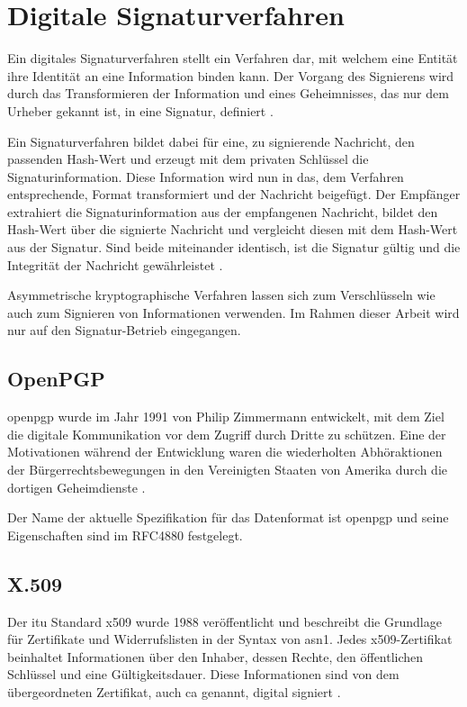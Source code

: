 \section{Digitale Signaturverfahren}
\label{sec:GrundlagenDefinitionen:DigitaleSignaturen:Verfahren}
Ein digitales Signaturverfahren stellt ein Verfahren dar, mit welchem eine Entität ihre Identität an eine Information binden kann. Der Vorgang des Signierens
wird durch das Transformieren der Information und eines Geheimnisses, das nur dem Urheber gekannt ist, in eine Signatur, definiert \cite{hac}.

Ein Signaturverfahren bildet dabei für eine, zu signierende Nachricht, den passenden Hash-Wert und erzeugt mit dem privaten Schlüssel die Signaturinformation.
Diese Information wird nun in das, dem Verfahren entsprechende, Format transformiert und der Nachricht beigefügt.
Der Empfänger extrahiert die Signaturinformation aus der empfangenen Nachricht, bildet den Hash-Wert über die signierte Nachricht und vergleicht diesen mit dem
Hash-Wert aus der Signatur. Sind beide miteinander identisch, ist die Signatur gültig und die Integrität der Nachricht gewährleistet \cite{hac,singh:messages}.

Asymmetrische kryptographische Verfahren lassen sich zum Verschlüsseln wie auch zum Signieren von Informationen verwenden. Im Rahmen dieser Arbeit wird nur auf
den Signatur-Betrieb eingegangen.

\subsection{OpenPGP}
\label{sec:GrundlagenDefinitionen:DigitaleSignaturen:Verfahren:openpgp}
\gls{openpgp} wurde im Jahr 1991 von Philip Zimmermann \cite{zimmermann:pgp} entwickelt, mit dem Ziel die digitale Kommunikation vor dem Zugriff durch Dritte zu
schützen. Eine der Motivationen während der Entwicklung waren die wiederholten Abhöraktionen der Bürgerrechtsbewegungen in den Vereinigten Staaten von Amerika
durch die dortigen Geheimdienste \cite{singh:messages}.

Der Name der aktuelle Spezifikation für das Datenformat ist \gls{openpgp} und seine Eigenschaften sind im RFC4880 \cite{openpgp:ietf} festgelegt.

\subsection{X.509}
\label{sec:GrundlagenDefinitionen:DigitaleSignaturen:Verfahren:x509}
Der \gls{itu} Standard \gls{x509} wurde 1988 veröffentlicht und beschreibt die Grundlage für Zertifikate und Widerrufslisten in der Syntax von \gls{asn1}.
Jedes \gls{x509}-Zertifikat beinhaltet Informationen über den Inhaber, dessen Rechte, den öffentlichen Schlüssel und eine Gültigkeitsdauer. Diese Informationen
sind von dem übergeordneten Zertifikat, auch \gls{ca} genannt, digital signiert \cite{x509:ietf}.


